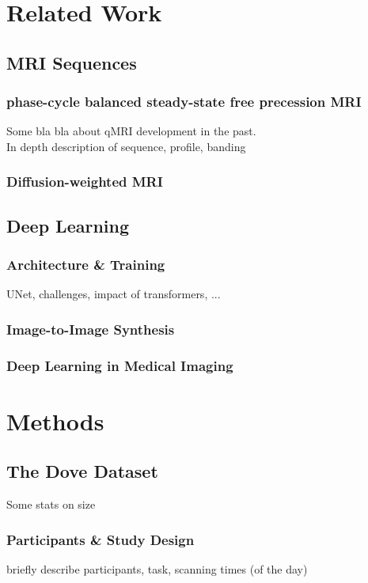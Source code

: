\chapter{Related Work}
\section{MRI Sequences}
\subsection{phase-cycle balanced steady-state free precession MRI}
Some bla bla about qMRI development in the past. \\
In depth description of sequence, profile, banding

\subsection{Diffusion-weighted MRI}

\section{Deep Learning}
\subsection{Architecture \& Training}
UNet, challenges, impact of transformers, ...

\subsection{Image-to-Image Synthesis}

\subsection{Deep Learning in Medical Imaging}



\chapter{Methods}\label{\positionnumber} 
\section{The Dove Dataset}
Some stats on size 
\subsection{Participants \& Study Design}
briefly describe participants, task, scanning times (of the day)


